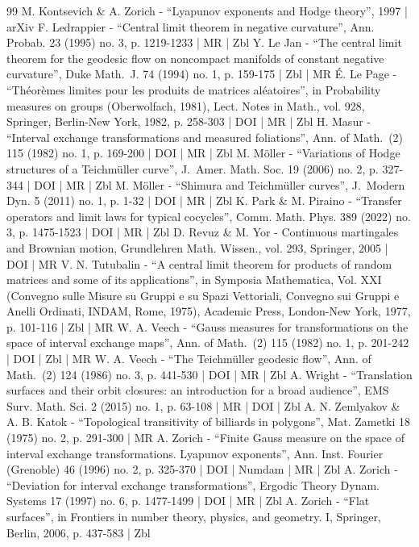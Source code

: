 \documentclass[10pt]{amsart}
\theoremstyle{plain}
\theoremstyle{definition}
\numberwithin{equation}{subsection}
\begin{document}
\begin{thebibliography}{99}
M. Kontsevich \& A. Zorich - “Lyapunov exponents and Hodge theory”, 1997 | arXiv
F. Ledrappier - “Central limit theorem in negative curvature”, Ann. Probab. 23 (1995) no. 3, p. 1219-1233 | MR | Zbl
Y. Le Jan - “The central limit theorem for the geodesic flow on noncompact manifolds of constant negative curvature”, Duke Math. J. 74 (1994) no. 1, p. 159-175 | Zbl | MR
É. Le Page - “Théorèmes limites pour les produits de matrices aléatoires”, in Probability measures on groups (Oberwolfach, 1981), Lect. Notes in Math., vol. 928, Springer, Berlin-New York, 1982, p. 258-303 | DOI | MR | Zbl
H. Masur - “Interval exchange transformations and measured foliations”, Ann. of Math. (2) 115 (1982) no. 1, p. 169-200 | DOI | MR | Zbl
M. Möller - “Variations of Hodge structures of a Teichmüller curve”, J. Amer. Math. Soc. 19 (2006) no. 2, p. 327-344 | DOI | MR | Zbl
M. Möller - “Shimura and Teichmüller curves”, J. Modern Dyn. 5 (2011) no. 1, p. 1-32 | DOI | MR | Zbl
K. Park \& M. Piraino - “Transfer operators and limit laws for typical cocycles”, Comm. Math. Phys. 389 (2022) no. 3, p. 1475-1523 | DOI | MR | Zbl
D. Revuz \& M. Yor - Continuous martingales and Brownian motion, Grundlehren Math. Wissen., vol. 293, Springer, 2005 | DOI | MR
V. N. Tutubalin - “A central limit theorem for products of random matrices and some of its applications”, in Symposia Mathematica, Vol. XXI (Convegno sulle Misure su Gruppi e su Spazi Vettoriali, Convegno sui Gruppi e Anelli Ordinati, INDAM, Rome, 1975), Academic Press, London-New York, 1977, p. 101-116 | Zbl | MR
W. A. Veech - “Gauss measures for transformations on the space of interval exchange maps”, Ann. of Math. (2) 115 (1982) no. 1, p. 201-242 | DOI | Zbl | MR
W. A. Veech - “The Teichmüller geodesic flow”, Ann. of Math. (2) 124 (1986) no. 3, p. 441-530 | DOI | MR | Zbl
A. Wright - “Translation surfaces and their orbit closures: an introduction for a broad audience”, EMS Surv. Math. Sci. 2 (2015) no. 1, p. 63-108 | MR | DOI | Zbl
A. N. Zemlyakov \& A. B. Katok - “Topological transitivity of billiards in polygons”, Mat. Zametki 18 (1975) no. 2, p. 291-300 | MR
A. Zorich - “Finite Gauss measure on the space of interval exchange transformations. Lyapunov exponents”, Ann. Inst. Fourier (Grenoble) 46 (1996) no. 2, p. 325-370 | DOI | Numdam | MR | Zbl
A. Zorich - “Deviation for interval exchange transformations”, Ergodic Theory Dynam. Systems 17 (1997) no. 6, p. 1477-1499 | DOI | MR | Zbl
A. Zorich - “Flat surfaces”, in Frontiers in number theory, physics, and geometry. I, Springer, Berlin, 2006, p. 437-583 | Zbl
\end{thebibliography}
\end{document}
